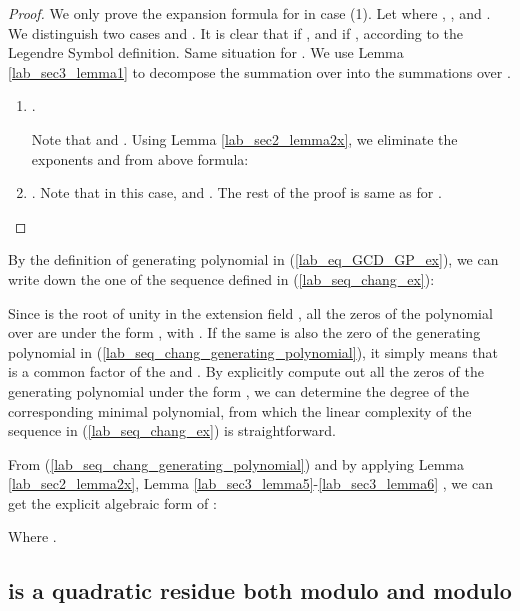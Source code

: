 \documentclass{mcom-l}
\theoremstyle{definition}
\numberwithin{equation}{section}
\begin{document}
            \begin{proof}
            We only prove the expansion formula for  in case (1).  Let  where , , and . We distinguish two cases  and . It is clear that  if , and  if , according to the Legendre Symbol definition. Same situation for . We use Lemma \ref{lab_sec3_lemma1} to decompose the summation over  into the summations over .
            \begin{enumerate}
            \item .
            
            Note that  and . Using Lemma \ref{lab_sec2_lemma2x}, we eliminate the exponents  and  from  above formula:
             
            \item  . Note that in this case,   and  . The rest of the proof is same as for .
            
            \end{enumerate}
            
            \end{proof}
                 
              
              
             
            By the definition of generating polynomial in (\ref{lab_eq_GCD_GP_ex}), we can  write down the one of the sequence defined in (\ref{lab_seq_chang_ex}):
            
            
            Since  is the  root of unity in the extension field , all the zeros of the polynomial  over  are under the form , with . If the same  is also the zero of the generating polynomial in (\ref{lab_seq_chang_generating_polynomial}), it simply means that  is a common factor of the  and  . By explicitly compute out all the zeros of the generating polynomial  under the form , we can determine the degree of the corresponding minimal polynomial, from which the linear complexity of the sequence in (\ref{lab_seq_chang_ex}) is straightforward.
            
            From (\ref{lab_seq_chang_generating_polynomial}) and by  applying Lemma \ref{lab_sec2_lemma2x}, Lemma \ref{lab_sec3_lemma5}-\ref{lab_sec3_lemma6} , we can get the explicit algebraic form of :
            
            Where .
            
   \subsection{ is a quadratic residue both modulo  and modulo }  
    
\end{document}
